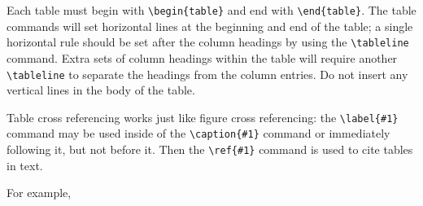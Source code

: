 Each table must begin with \verb+\begin{table}+ and end with
\verb+\end{table}+.  The table commands will set horizontal
lines at the beginning and end of the table; a single horizontal
rule should be set after the column headings by using the
\verb+\tableline+ command. Extra sets of column headings within the table will
require another \verb+\tableline+ to separate the headings from the column
entries. Do not insert any vertical lines in the body of the table.
 
Table cross referencing works just like figure cross referencing: the
\verb+\label{#1}+ command may be used inside of the \verb+\caption{#1}+
command or immediately following it, but not before it. Then 
the  \verb+\ref{#1}+
command is used to cite tables in text.
 
For example,
 
